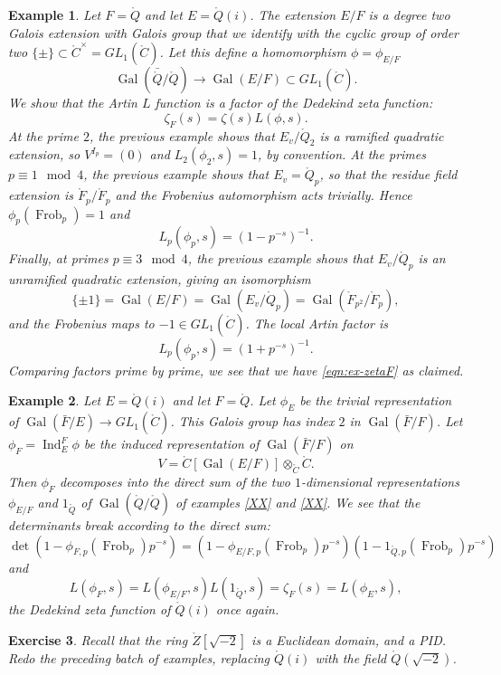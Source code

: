 \documentclass{amsart}
\newtheorem{exercise}{Exercise}
\newtheorem{example}[exercise]{Example}
\def\op#1{{\operatorname{#1}}}
\def\CC{\ring{C}}
\def\oG{\op{Gal}}
\begin{document}
\begin{example} Let $F=\ring{Q}$ and let $E=\ring{Q}(i)$.  The extension
$E/F$ is a degree two Galois extension with Galois group that we identify
with the cyclic group of order two $\{\pm\}\subset\CC^\times=GL_1(\CC)$.
Let this define a homomorphism $\phi=\phi_{E/F}$
\[
\oG(\bar{\ring{Q}}/\ring{Q})\to \oG(E/F) \subset GL_1(\CC).
\]
We show that the Artin $L$ function is a factor of the Dedekind zeta function:
\begin{equation}\label{eqn:ex-zetaF}
\zeta_F(s) = \zeta(s) L(\phi,s).
\end{equation}
At the prime $2$, the previous example shows that $E_v/\ring{Q}_2$ is a ramified
quadratic extension, so $V^{I_p}=(0)$ and $L_2(\phi_2,s)=1$, by convention.
At the primes $p\equiv 1 \mod 4$, the previous example shows that $E_v=\ring{Q}_p$,
so that the residue field extension is $\ring{F}_p/\ring{F}_p$ and the Frobenius
automorphism acts trivially.  Hence $\phi_p(\op{Frob}_p)=1$ and 
\[
L_p(\phi_p,s)=(1-p^{-s})^{-1}.
\]
Finally, at primes $p\equiv 3\mod 4$, the previous example shows that $E_v/\ring{Q}_p$
is an unramified quadratic extension, giving an isomorphism
\[
\{\pm1\}=\oG(E/F) = \oG(E_v/\ring{Q}_p) = \oG(\ring{F}_{p^2}/\ring{F}_p),
\]
and the Frobenius maps to $-1\in GL_1(\CC)$.  The local Artin factor is
\[
L_p(\phi_p,s) = (1+p^{-s})^{-1}.
\]
Comparing factors prime by prime, we see that we have
\eqref{eqn:ex-zetaF} as claimed.
\end{example}

\begin{example} Let $E=\ring{Q}(i)$ and let $F=\ring{Q}$.  Let $\phi_E$ be the
trivial representation of $\oG(\bar{F}/E)\to GL_1(\CC)$.  This Galois
group has index $2$ in $\oG(\bar F/F)$.  Let 
$\phi_F=\op{Ind}_E^F\phi$ be the induced representation
of $\oG(\bar{F}/F)$ on
\[
V=\CC[\oG(E/F)]\otimes_{\CC} \CC.
\]
Then $\phi_F$ decomposes into the direct sum of the two $1$-dimensional representations
$\phi_{E/F}$ and $1_{\ring{Q}}$
of $\oG(\ring{Q}/\ring{Q})$
of examples \ref{XX} and \ref{XX}.  We see that
the determinants break according to the direct sum:
\[
\det(1 - \phi_{F,p}(\op{Frob}_p)p^{-s}) = 
(1 - \phi_{E/F,p}(\op{Frob}_p)p^{-s})(1-1_{{\ring{Q},p}}(\op{Frob}_p)p^{-s})
\]
and 
\[
L(\phi_F,s) = L(\phi_{E/F},s) L(1_{\ring{Q}},s) = \zeta_F(s) = L(\phi_E,s),
\]
the Dedekind zeta function of $\ring{Q}(i)$ once again.
\end{example}

\begin{exercise} Recall that the ring $\ring{Z}[\sqrt{-2}]$ is a
  Euclidean domain, and a PID.  Redo the preceding batch of examples,
  replacing $\ring{Q}(i)$ with the field $\ring{Q}(\sqrt{-2})$.
\end{exercise}
\end{document}
